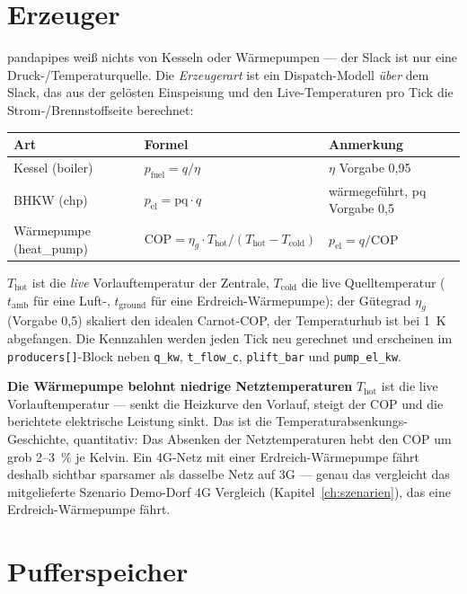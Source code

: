 \documentclass[11pt,a4paper,parskip=half]{scrreprt}
\newenvironment{beispiel}[1][Beispiel]
  {\par\medskip{\color{bsp}\hrule height 0.8pt}\nopagebreak\smallskip
   \noindent\textbf{\textsf{\textcolor{bsp}{#1}}}\quad\ignorespaces}
  {\par\nopagebreak\smallskip{\color{bsp}\hrule height 0.8pt}\par\medskip}
\begin{document}
\section{Erzeuger}
\label{sec:erzeuger}

pandapipes weiß nichts von Kesseln oder Wärmepumpen --- der Slack ist nur eine
Druck-/Temperaturquelle. Die \emph{Erzeugerart} ist ein Dispatch-Modell
\emph{über} dem Slack, das aus der gelösten Einspeisung und den Live-Temperaturen
pro Tick die Strom-/Brennstoffseite berechnet:

{\small
\begin{center}
\begin{tabular}{@{}lll@{}}
\toprule
Art & Formel & Anmerkung \\
\midrule
Kessel (boiler) & $p_\text{fuel}=q/\eta$ & $\eta$ Vorgabe 0{,}95 \\
BHKW (chp)      & $p_\text{el}=\text{pq}\cdot q$ & wärmegeführt, pq Vorgabe 0{,}5 \\
Wärmepumpe (heat\_pump) & $\text{COP}=\eta_g\cdot T_\text{hot}/(T_\text{hot}-T_\text{cold})$ & $p_\text{el}=q/\text{COP}$ \\
\bottomrule
\end{tabular}
\end{center}}

$T_\text{hot}$ ist die \emph{live} Vorlauftemperatur der Zentrale, $T_\text{cold}$
die live Quelltemperatur ($t_\text{amb}$ für eine Luft-, $t_\text{ground}$ für
eine Erdreich-Wärmepumpe); der Gütegrad $\eta_g$ (Vorgabe 0{,}5) skaliert den
idealen Carnot-COP, der Temperaturhub ist bei 1~K abgefangen. Die Kennzahlen
werden jeden Tick neu gerechnet und erscheinen im \texttt{producers[]}-Block
neben \texttt{q\_kw}, \texttt{t\_flow\_c}, \texttt{plift\_bar} und
\texttt{pump\_el\_kw}.

\begin{beispiel}[Die Wärmepumpe belohnt niedrige Netztemperaturen]
$T_\text{hot}$ ist die live Vorlauftemperatur --- senkt die Heizkurve den
Vorlauf, steigt der COP und die berichtete elektrische Leistung sinkt. Das ist
die Temperaturabsenkungs-Geschichte, quantitativ: Das Absenken der
Netztemperaturen hebt den COP um grob 2--3~\% je Kelvin. Ein 4G-Netz mit einer
Erdreich-Wärmepumpe fährt deshalb sichtbar sparsamer als dasselbe Netz auf 3G ---
genau das vergleicht das mitgelieferte Szenario \glqq Demo-Dorf 4G Vergleich\grqq
(Kapitel~\ref{ch:szenarien}), das eine Erdreich-Wärmepumpe fährt.
\end{beispiel}

\section{Pufferspeicher}
\label{sec:speicher}
\end{document}
